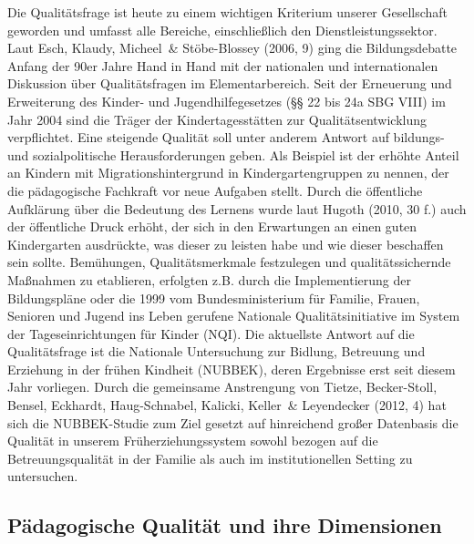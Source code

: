 Die Qualitätsfrage ist heute zu einem wichtigen Kriterium unserer Gesellschaft geworden und umfasst alle Bereiche, einschließlich den Dienstleistungssektor. Laut Esch, Klaudy, Micheel~\& Stöbe-Blossey (2006, 9) ging die Bildungsdebatte Anfang der 90er Jahre Hand in Hand mit der nationalen und internationalen Diskussion über Qualitätsfragen im Elementarbereich. Seit der Erneuerung und Erweiterung des Kinder- und Jugendhilfegesetzes (§§ 22 bis 24a SBG VIII) im Jahr 2004 sind die Träger der Kindertagesstätten zur Qualitätsentwicklung verpflichtet. Eine steigende Qualität soll unter anderem Antwort auf bildungs- und sozialpolitische Herausforderungen geben. Als Beispiel ist der erhöhte Anteil an Kindern mit Migrationshintergrund in Kindergartengruppen zu nennen, der die pädagogische Fachkraft vor neue Aufgaben stellt.
Durch die öffentliche Aufklärung über die Bedeutung des Lernens wurde laut Hugoth (2010, 30 f.) auch der öffentliche Druck erhöht, der sich in den Erwartungen an einen guten Kindergarten ausdrückte, was dieser zu leisten habe und wie dieser beschaffen sein sollte. 
Bemühungen, Qualitätsmerkmale festzulegen und qualitätssichernde Maßnahmen zu etablieren, erfolgten z.B. durch die Implementierung der Bildungspläne oder die 1999 vom Bundesministerium für Familie, Frauen, Senioren und Jugend ins Leben gerufene Nationale Qualitätsinitiative im System der Tageseinrichtungen für Kinder (NQI). 
Die aktuellste Antwort auf die Qualitätsfrage ist die Nationale Untersuchung zur Bidlung, Betreuung und Erziehung in der frühen Kindheit (NUBBEK), deren Ergebnisse erst seit diesem Jahr vorliegen. Durch die gemeinsame Anstrengung von Tietze, Becker-Stoll, Bensel, Eckhardt, Haug-Schnabel, Kalicki, Keller~\& Leyendecker (2012, 4) hat sich die  NUBBEK-Studie zum Ziel gesetzt auf hinreichend großer Datenbasis die Qualität in unserem Früherziehungssystem sowohl bezogen auf die Betreuungsqualität in der Familie als auch im institutionellen Setting zu untersuchen. 
  
\subsection{Pädagogische Qualität und ihre Dimensionen}

